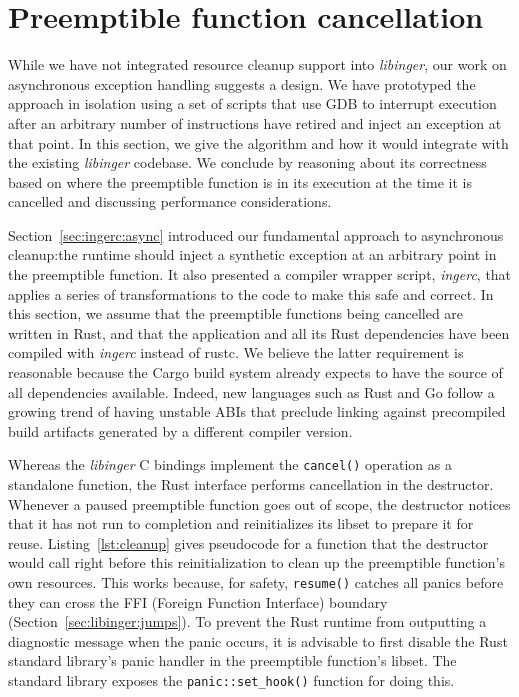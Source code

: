 \section{Preemptible function cancellation}
\label{sec:ingerc:cancellation}

While we have not integrated resource cleanup support into \textit{libinger}, our
work on asynchronous exception handling suggests a design.  We have prototyped the
approach in isolation using a set of scripts that use GDB to interrupt execution
after an arbitrary number of instructions have retired and inject an exception at
that point.  In this section, we give the algorithm and how it would integrate with
the existing \textit{libinger} codebase.  We conclude by reasoning about its
correctness based on where the preemptible function is in its execution at the time
it is cancelled and discussing performance considerations.

\begin{sloppypar}
Section~\ref{sec:ingerc:async} introduced our fundamental approach to asynchronous
cleanup:\@ the runtime should inject a synthetic exception at an arbitrary point in
the preemptible function.  It also presented a compiler wrapper script,
\textit{ingerc}, that applies a series of transformations to the code to make this
safe and correct.  In this section, we assume that the preemptible functions being
cancelled are written in Rust, and that the application and all its Rust dependencies
have been compiled with \textit{ingerc} instead of rustc.  We believe the latter
requirement is reasonable because the Cargo build system already expects to have the
source of all dependencies available.  Indeed, new languages such as Rust and Go
follow a growing trend of having unstable ABIs that preclude linking against
precompiled build artifacts generated by a different compiler version.
\end{sloppypar}

Whereas the \textit{libinger} C bindings implement the \texttt{cancel()} operation as
a standalone function, the Rust interface performs cancellation in the destructor.
Whenever a paused preemptible function goes out of scope, the destructor notices that
it has not run to completion and reinitializes its libset to prepare it for reuse.
Listing~\ref{lst:cleanup} gives pseudocode for a function that the destructor would
call right before this reinitialization to clean up the preemptible function's own
resources.  This works because, for safety, \texttt{resume()} catches all panics
before they can cross the FFI (Foreign Function Interface) boundary
(Section~\ref{sec:libinger:jumps}).  To prevent the
Rust runtime from outputting a diagnostic message when the panic occurs, it is
advisable to first disable the Rust standard library's panic handler in the
preemptible function's libset.  The standard library exposes the
\texttt{panic::set\_hook()} function for doing this.

